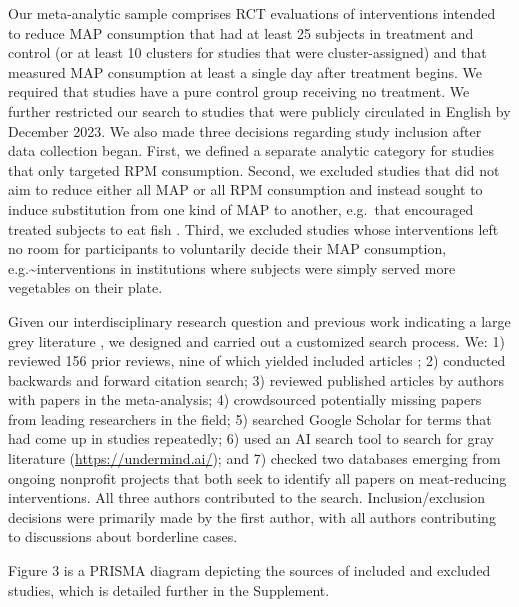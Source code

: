 \documentclass[preprint, 3p,
authoryear]{elsarticle} %
\begin{document}

Our meta-analytic sample comprises RCT evaluations of interventions
intended to reduce MAP consumption that had at least 25 subjects in
treatment and control (or at least 10 clusters for studies that were
cluster-assigned) and that measured MAP consumption at least a single
day after treatment begins. We required that studies have a pure control
group receiving no treatment. We further restricted our search to
studies that were publicly circulated in English by December 2023. We
also made three decisions regarding study inclusion after data
collection began. First, we defined a separate analytic category for
studies that only targeted RPM consumption. Second, we excluded studies
that did not aim to reduce either all MAP or all RPM consumption and
instead sought to induce substitution from one kind of MAP to another,
e.g.~that encouraged treated subjects to eat fish \citep{johansen2009}.
Third, we excluded studies whose interventions left no room for
participants to voluntarily decide their MAP consumption,
e.g.\textasciitilde interventions in institutions where subjects were
simply served more vegetables on their plate.

Given our interdisciplinary research question and previous work
indicating a large grey literature \citep{mathur2021meta}, we designed
and carried out a customized search process. We: 1) reviewed 156 prior
reviews, nine of which yielded included articles
\citep{mathur2021meta, bianchi2018conscious, bianchi2018restructuring, ammann2023, chang2023, DiGennaro2024, harguess2020, ronto2022, wynes2018};
2) conducted backwards and forward citation search; 3) reviewed
published articles by authors with papers in the meta-analysis; 4)
crowdsourced potentially missing papers from leading researchers in the
field; 5) searched Google Scholar for terms that had come up in studies
repeatedly; 6) used an AI search tool to search for gray literature
(\url{https://undermind.ai/}); and 7) checked two databases emerging
from ongoing nonprofit projects that both seek to identify all papers on
meat-reducing interventions. All three authors contributed to the
search. Inclusion/exclusion decisions were primarily made by the first
author, with all authors contributing to discussions about borderline
cases.

Figure 3 is a PRISMA diagram depicting the sources of included and
excluded studies, which is detailed further in the Supplement.
\end{document}
